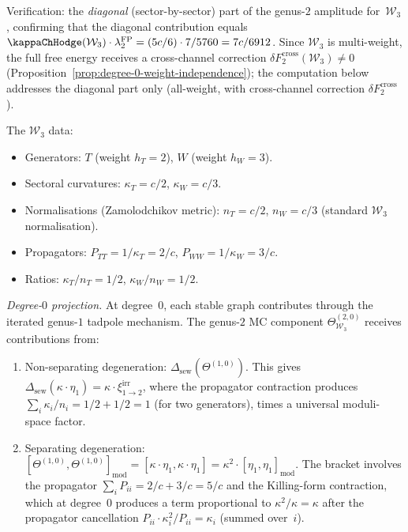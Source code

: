 \begin{computation}
\label{comp:genus-2-w3}

Verification: the \emph{diagonal} (sector-by-sector) part of the
genus-$2$ amplitude for~$\mathcal{W}_3$, confirming that the
diagonal contribution equals
$\kappaChHodge(\mathcal{W}_3) \cdot
\lambda_2^{\mathrm{FP}} = (5c/6) \cdot 7/5760 = 7c/6912$.
Since $\mathcal{W}_3$ is multi-weight, the full free energy
receives a cross-channel correction
$\delta F_2^{\mathrm{cross}}(\mathcal{W}_3) \neq 0$
\textup{(}Proposition~\ref{prop:degree-0-weight-independence}\textup{)};
the computation below addresses the diagonal part only
\textup{(all-weight, with cross-channel correction
$\delta F_2^{\mathrm{cross}}$)}. %

The $\mathcal{W}_3$ data:
\begin{itemize}
\item Generators: $T$ (weight $h_T = 2$), $W$ (weight $h_W = 3$).
\item Sectoral curvatures: $\kappa_T = c/2$, $\kappa_W = c/3$.
\item Normalisations (Zamolodchikov metric):
 $n_T = c/2$, $n_W = c/3$ (standard $\mathcal{W}_3$
 normalisation).
\item Propagators: $P_{TT} = 1/\kappa_T = 2/c$,
 $P_{WW} = 1/\kappa_W = 3/c$.
\item Ratios: $\kappa_T/n_T = 1/2$, $\kappa_W/n_W = 1/2$.
\end{itemize}

\emph{Degree-$0$ projection.} At degree~$0$, each stable graph
contributes through the iterated genus-$1$ tadpole
mechanism. The genus-$2$ MC component
$\Theta^{(2,0)}_{\mathcal{W}_3}$ receives contributions from:
\begin{enumerate}[label=\textup{(\alph*)}]
\item Non-separating degeneration:
 $\Delta_{\mathrm{sew}}(\Theta^{(1,0)})$. This gives
 $\Delta_{\mathrm{sew}}(\kappa \cdot \eta_1) = \kappa \cdot
 \xi_{1 \to 2}^{\mathrm{irr}}$, where the propagator
 contraction produces $\sum_i \kappa_i/n_i = 1/2 + 1/2 = 1$
 (for two generators), times a universal moduli-space factor.
\item Separating degeneration:
 $[\Theta^{(1,0)}, \Theta^{(1,0)}]_{\mathrm{mod}} =
 [\kappa \cdot \eta_1, \kappa \cdot \eta_1] =
 \kappa^2 \cdot [\eta_1, \eta_1]_{\mathrm{mod}}$. The
 bracket involves the propagator $\sum_i P_{ii} = 2/c + 3/c
 = 5/c$ and the Killing-form contraction, which at degree~$0$
 produces a term proportional to $\kappa^2 / \kappa = \kappa$
 after the propagator
 cancellation $P_{ii} \cdot \kappa_i^2 / P_{ii} = \kappa_i$
 (summed over~$i$).
\end{enumerate}


\end{computation}
